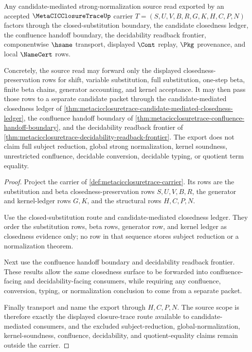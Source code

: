 \begin{theorem}
\label{thm:metacicclosuretrace-candidate-sn-source-scope}
Any candidate-mediated strong-normalization source read exported by an accepted $\MetaCICClosureTraceUp$ carrier $T=(S,U,V,B,R,G,K,H,C,P,N)$ factors through the closed-substitution boundary, the candidate closedness ledger, the confluence handoff boundary, the decidability readback frontier, componentwise $\hsame$ transport, displayed $\Cont$ replay, $\Pkg$ provenance, and local $\NameCert$ rows.

Concretely, the source read may forward only the displayed closedness-preservation rows for shift, variable substitution, full substitution, one-step beta, finite beta chains, generator accounting, and kernel acceptance. It may then pass those rows to a separate candidate packet through the candidate-mediated closedness ledger of \autoref{thm:metacicclosuretrace-candidate-mediated-closedness-ledger}, the confluence handoff boundary of \autoref{thm:metacicclosuretrace-confluence-handoff-boundary}, and the decidability readback frontier of \autoref{thm:metacicclosuretrace-decidability-readback-frontier}. The export does not claim full subject reduction, global strong normalization, kernel soundness, unrestricted confluence, decidable conversion, decidable typing, or quotient term equality.
\end{theorem}
\begin{proof}
Project the carrier of \autoref{def:metacicclosuretrace-carrier}. Its rows are the substitution and beta closedness-preservation rows $S,U,V,B,R$, the generator and kernel-ledger rows $G,K$, and the structural rows $H,C,P,N$.

Use the closed-substitution route and candidate-mediated closedness ledger. They order the substitution rows, beta rows, generator row, and kernel ledger as closedness evidence only; no row in that sequence stores subject reduction or a normalization theorem.

Next use the confluence handoff boundary and decidability readback frontier. These results allow the same closedness surface to be forwarded into confluence-facing and decidability-facing consumers, while requiring any confluence, conversion, typing, or normalization conclusion to come from a separate packet.

Finally transport and name the export through $H,C,P,N$. The source scope is therefore exactly the displayed closure-trace route available to candidate-mediated consumers, and the excluded subject-reduction, global-normalization, kernel-soundness, confluence, decidability, and quotient-equality claims remain outside the carrier.
\end{proof}

